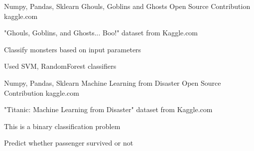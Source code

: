 

\begin{cventries}


  \cventry
    {Numpy, Pandas, Sklearn} %
    {Ghouls, Goblins and Ghosts} %
    {Open Source Contribution} %
    {kaggle.com} %
    {
      \begin{cvitems} %
        \item{"Ghouls, Goblins, and Ghosts... Boo!" dataset from Kaggle.com}
        \item{Classify monsters based on input parameters}
        \item{Used SVM, RandomForest classifiers}
      \end{cvitems}
    }

  \cventry
    {Numpy, Pandas, Sklearn} %
    {Machine Learning from Disaster} %
    {Open Source Contribution} %
    {kaggle.com} %
    {
      \begin{cvitems} %
        \item{"Titanic: Machine Learning from Disaster" dataset from Kaggle.com}
        \item{This is a binary classification problem}
        \item{Predict whether passenger survived or not}
      \end{cvitems}
    }

\end{cventries}